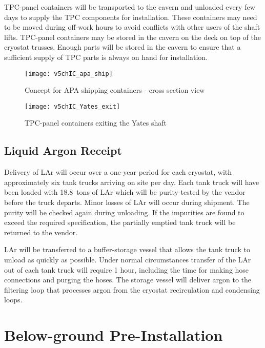 TPC-panel containers will be transported to the cavern and unloaded every few days to supply the TPC components for installation. These containers may need to be moved during off-work hours to avoid conflicts with other users of the shaft lifts. TPC-panel containers may be stored in the cavern on the deck on top of the cryostat trusses. Enough parts will be stored in the cavern to ensure that a sufficient supply of TPC parts is always on hand for installation.



\begin{figure}[htbp]
\centering
\texttt{[image: v5chIC\_apa\_ship]}
\caption{Concept for APA shipping containers - cross section view}
\label{fig:apa_ship}
\end{figure}

\begin{figure}[htpb]
\centering
\texttt{[image: v5chIC\_Yates\_exit]}
\caption{TPC-panel containers exiting the Yates shaft}
\label{fig:install-yates}
\end{figure}

\subsection{Liquid Argon Receipt}

Delivery of LAr will occur over a one-year period for each cryostat, with approximately six tank trucks arriving on site per day. Each tank truck will have been loaded with 18.8~tons of LAr  which will be purity-tested by the vendor before the truck departs. Minor losses of LAr will occur during shipment. The purity will be checked again during unloading. If the impurities are found to exceed the required specification, the partially emptied tank truck will be returned to the vendor.

LAr will be transferred to a buffer-storage vessel that allows the tank truck to unload as quickly as possible. Under normal circumstances transfer of the LAr out of each tank truck will require 1 hour, including the time for making hose connections and purging the hoses. The storage vessel will deliver argon to the filtering loop that processes argon from the cryostat recirculation and condensing loops.


\section{Below-ground Pre-Installation}

